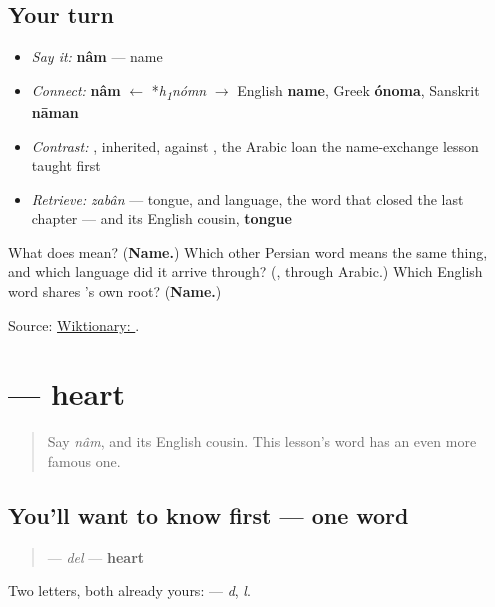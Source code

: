 \subsection*{Your turn}
\begin{itemize}
\raggedright
  \item \emph{Say it:} \textbf{nâm} — name
  \item \emph{Connect:} \textbf{nâm} $\leftarrow$ *\emph{h\textsubscript{1}nómn} $\to$ English \textbf{name}, Greek \textbf{ónoma}, Sanskrit \textbf{nāman}
  \item \emph{Contrast:} \textbf{}, inherited, against \textbf{}, the Arabic loan the name-exchange lesson taught first
  \item \emph{Retrieve:} \emph{zabân} — tongue, and language, the word that closed the last chapter — and its English cousin, \textbf{tongue}
\end{itemize}

\begin{tcolorbox}[breakable,colback=teal!4,colframe=teal!35!black,title={Before you move on}]
What does \textbf{} mean? (\textbf{Name.}) Which other Persian word means the same thing, and which language did it arrive through? (\textbf{}, through Arabic.) Which English word shares 's own root? (\textbf{Name.})

Source: \href{https://en.wiktionary.org/wiki/\%D9\%86\%D8\%A7\%D9\%85}{Wiktionary: }.
\end{tcolorbox}
\section[\texorpdfstring{\fa{دل} (del)}{دل (del)}]{ — heart}

\label{lesson:FA-C12-del}



\begin{quote}
Say \emph{nâm}, and its English cousin. This lesson's word has an even more famous one.
\end{quote}

\subsection*{You'll want to know first — one word}
\begin{quote}
\textbf{} — \emph{del} — \textbf{heart}
\end{quote}

Two letters, both already yours: \textbf{ } — \emph{d}, \emph{l}.

